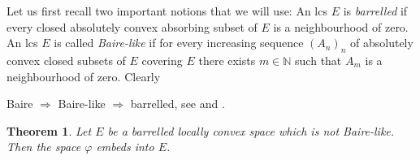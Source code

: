 \documentclass[12pt]{amsart}
\theoremstyle{plain}
\newtheorem{theorem}{Theorem}[section]
\theoremstyle{definition}
\theoremstyle{remark}
\begin{document}
Let us first recall two important notions that we will use: An lcs $E$ is \emph{ barrelled } if every closed absolutely convex absorbing subset of $E$ is a neighbourhood of zero.  An lcs $E$ is called \emph{Baire-like} if for every increasing sequence $(A_n)_{n}$ of absolutely  convex  closed subsets of $E$ covering $E$ there exists $m\in\mathbb{N}$ such that $A_m$ is a neighbourhood of zero. Clearly
\begin{center}
 Baire $\Rightarrow$ Baire-like  $\Rightarrow$ barrelled, see \cite{Saxon} and \cite{Na-Saxon}.

\end{center}
\begin{theorem}\label{ZZ}
Let $E$ be a barrelled locally convex space which is not Baire-like. Then the space $\varphi$ embeds into $E$.
\end{theorem}
\end{document}
